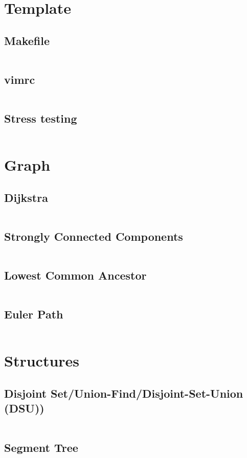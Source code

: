 \section{Template}
  \subsection{Makefile}
    \inputminted{basemake}{library/template/Makefile}
  \subsection{vimrc}
    \inputminted{vim}{library/template/.vimrc}
  \subsection{Stress testing}
    \inputminted{bash}{library/template/stress.sh}

\section{Graph}
  \subsection{Dijkstra}
    \inputminted{cpp}{library/graphs/dijkstra.cpp}
  \subsection{Strongly Connected Components}
    \inputminted{cpp}{library/graphs/scc.cpp}
  \subsection{Lowest Common Ancestor}
    \inputminted{cpp}{library/graphs/lca.cpp}
  \subsection{Euler Path}
    \inputminted{cpp}{library/graphs/euler_path.cpp}

\section{Structures}
  \subsection{Disjoint Set/Union-Find/Disjoint-Set-Union (DSU))}
    \inputminted{cpp}{library/structures/dsu.hpp}
  \subsection{Segment Tree}
    \inputminted{cpp}{library/structures/segment_tree.hpp}
